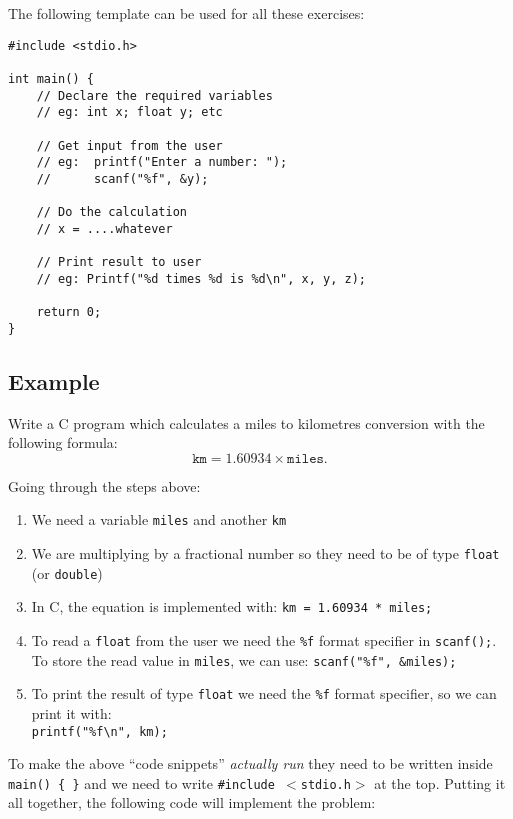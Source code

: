 \documentclass{lab}
\begin{document}
The following template can be used for all these exercises:

\begin{lstlisting}[style=CStyle]
#include <stdio.h>

int main() {
	// Declare the required variables 
	// eg: int x; float y; etc	
	
	// Get input from the user
	// eg: 	printf("Enter a number: ");
	// 		scanf("%f", &y);	
	
	// Do the calculation
	// x = ....whatever
	
	// Print result to user
	// eg: Printf("%d times %d is %d\n", x, y, z);
		
	return 0;
}
\end{lstlisting}

\pagebreak
\subsection{Example}
Write a C program which calculates a miles to kilometres conversion with the following formula:
\begin{equation}
\texttt{km} = 1.60934 \times \texttt{miles}.
\end{equation}

Going through the steps above:
\begin{enumerate}
\item We need a variable \texttt{miles} and another \texttt{km}
\item We are multiplying by a fractional number so they need to be of type \texttt{float} (or \texttt{double})
\item In C, the equation is implemented with: \texttt{km = 1.60934 * miles;}
\item To read a \texttt{float} from the user we need the \texttt{\%f} format specifier in \texttt{scanf();}. To store the read value in \texttt{miles}, we can use: \texttt{scanf("\%f", \&miles);}
\item To print the result of type \texttt{float} we need the \texttt{\%f} format specifier, so we can print it with:\\ \texttt{printf("\%f\textbackslash n", km);}
\end{enumerate}

To make the above ``code snippets'' \textit{actually run} they need to be written inside \texttt{main() \{ \}} and we need to write \texttt{\#include $<$stdio.h$>$} at the top. Putting it all together, the following code will implement the problem:
\end{document}
